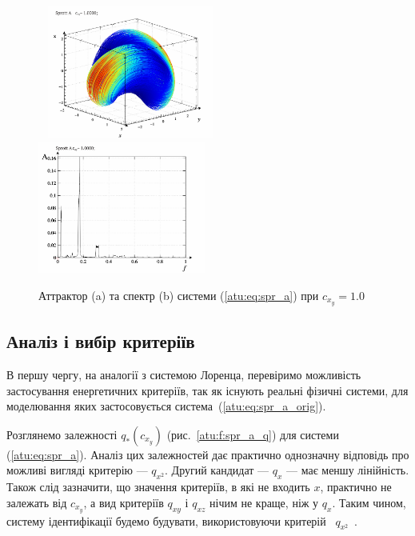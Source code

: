 \begin{figure}[htb!]
\centerline{
  ~ \hfill
  \includegraphics[width=0.49\textwidth]{p/cha/spr_a/sprott_a-p_xyz_cx_y=1x000.png}
  \hfill
  \includegraphics[width=0.49\textwidth]{p/cha/spr_a/sprott_a_f-p_f_cx_y=1x000.png}
  \hfill ~
}
\caption{Аттрактор (a) та спектр (b) системи (\ref{atu:eq:spr_a}) при $c_{x_y} =1.0$}
\label{atu:f:spr_a_p_1000}
\end{figure}



\subsection{Аналіз і вибір критеріїв}%

В першу чергу, на аналогії з системою Лоренца, перевіримо
можливість застосування енергетичних критеріїв, так як існують
реальні фізичні системи, для моделювання яких застосовується
система~(\ref{atu:eq:spr_a_orig}).

Розглянемо залежності
$ q_{*} (c_{x_y}) $ (рис.~\ref{atu:f:spr_a_q}) для системи (\ref{atu:eq:spr_a}). Аналіз цих
залежностей дає практично однозначну відповідь про можливі
вигляді критерію ---
$ q_{x^2} $. Другий кандидат ---
$ q_{x} $ --- має меншу лінійність. Також слід зазначити, що значення
критеріїв, в які не входить
$ x $, практично не залежать від
$ c_{x_y} $, а вид критеріїв
$ q_{xy} $ і
$ q_{xz} $ нічим не краще, ніж у
$ q_{x} $. Таким чином, систему ідентифікації будемо будувати,
використовуючи критерій~
$ q_{x^2} $~\cite{atu_kher2016}.

